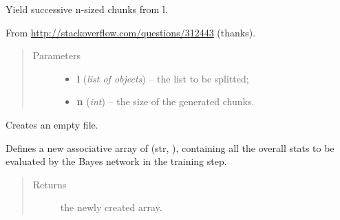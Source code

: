 \documentclass[letterpaper,10pt,english]{sphinxmanual}
\begin{document}
\begin{fulllineitems}
\begin{fulllineitems}
\begin{quote}
\begin{description}
\end{description}\end{quote}

\end{fulllineitems}


\begin{fulllineitems}
\label{index:utils.Utils.chunks}
Yield successive n-sized chunks from l.

From \href{http://stackoverflow.com/questions/312443}{http://stackoverflow.com/questions/312443} (thanks).
\begin{quote}\begin{description}
\item[{Parameters}] \leavevmode\begin{itemize}
\item {} 
\textbf{l} (\emph{list of objects}) -- the list to be splitted;

\item {} 
\textbf{n} (\emph{int}) -- the size of the generated chunks.

\end{itemize}

\end{description}\end{quote}

\end{fulllineitems}


\begin{fulllineitems}
\label{index:utils.Utils.create_file}
Creates an empty file.

\end{fulllineitems}


\begin{fulllineitems}
\label{index:utils.Utils.create_stats}
Defines a new associative array of (str, {\hyperref[index:gen_stat.Stat]{}}),
containing all the overall stats to be evaluated by the Bayes network
in the training step.
\begin{quote}\begin{description}
\item[{Returns}] \leavevmode
the newly created array.


\end{description}
\end{quote}
\end{fulllineitems}
\end{fulllineitems}
\end{document}
